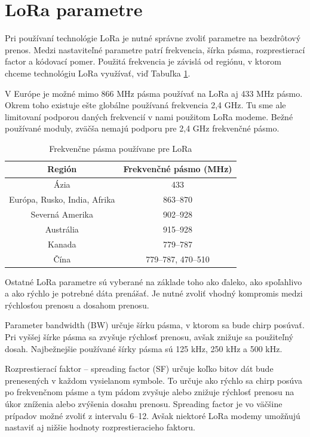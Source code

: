 \documentclass[slovak,master]{diploma}
\begin{document}
\newpage
\section{LoRa parametre}
Pri používaní technológie LoRa je nutné správne zvoliť parametre na bezdrôtový prenos. Medzi nastaviteľné parametre patrí frekvencia, šírka pásma, rozprestierací factor a kódovací pomer.
Použitá frekvencia je závislá od regiónu, v ktorom chceme technológiu LoRa využívať, viď Tabuľka \ref{tab:ismBands}. 

V Európe je možné mimo 866 MHz pásma používať na LoRa aj 433 MHz pásmo. Okrem toho existuje ešte globálne používaná frekvencia 2,4 GHz. Tu sme ale limitovaní 
podporou daných frekvencií v nami použitom LoRa modeme. Bežné používané moduly, zväčša nemajú podporu pre 2,4 GHz frekvenčné pásmo.

\begin{table}[h!]
	\centering
  \small
  \setlength\tabcolsep{6pt}
	\caption[Frekvenčne pásma používane pre LoRa]{Frekvenčne pásma používane pre LoRa}
  \begin{tabular}{c|c}
    \toprule
    Región & Frekvenčné pásmo (MHz)\\
    \midrule
    Ázia & 433 \\
    Európa, Rusko, India, Afrika & 863--870 \\
    Severná Amerika & 902--928 \\
    Austrália & 915--928 \\
    Kanada & 779--787 \\
    Čína & 779--787, 470--510 \\
    \midrule
  \end{tabular}
  \label{tab:ismBands}
\end{table}
\newpage

Ostatné LoRa parametre sú vyberané na základe toho ako ďaleko, ako spoľahlivo a ako rýchlo je potrebné dáta prenášať. Je nutné zvoliť vhodný kompromis medzi rýchlosťou prenosu 
a dosahom prenosu.

Parameter bandwidth (BW) určuje šírku pásma, v ktorom sa bude chirp posúvať. Pri vyššej šírke pásma sa zvyšuje rýchlosť prenosu, avšak znižuje sa použiteľný dosah.
Najbežnejšie používané šírky pásma sú 125 kHz, 250 kHz a 500 kHz.

Rozprestierací faktor -- spreading factor (SF) určuje koľko bitov dát bude prenesených v každom vysielanom symbole. To určuje ako rýchlo sa chirp posúva po frekvenčnom pásme a tym pádom 
zvyšuje alebo znižuje rýchlosť prenosu na úkor zníženia alebo zvýšenia dosahu prenosu. Spreading factor je vo väčšine prípadov možné zvoliť z intervalu 6--12. 
Avšak niektoré LoRa modemy umožňujú nastaviť aj nižšie hodnoty rozprestieracieho faktoru. 
\end{document}
